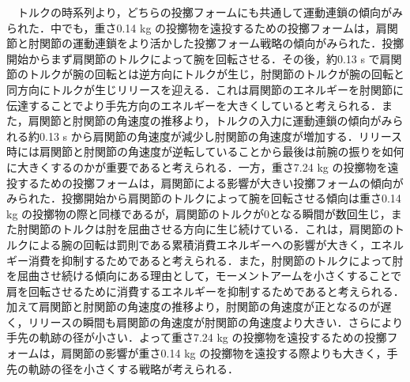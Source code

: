 　トルクの時系列より，どちらの投擲フォームにも共通して運動連鎖の傾向がみられた．中でも，重さ0.14 kg の投擲物を遠投するための投擲フォームは，肩関節と肘関節の運動連鎖をより活かした投擲フォーム戦略の傾向がみられた．投擲開始からまず肩関節のトルクによって腕を回転させる．その後，約0.13 s で肩関節のトルクが腕の回転とは逆方向にトルクが生じ，肘関節のトルクが腕の回転と同方向にトルクが生じリリースを迎える．これは肩関節のエネルギーを肘関節に伝達することでより手先方向のエネルギーを大きくしていると考えられる．また，肩関節と肘関節の角速度の推移より，トルクの入力に運動連鎖の傾向がみられる約0.13 s から肩関節の角速度が減少し肘関節の角速度が増加する．リリース時には肩関節と肘関節の角速度が逆転していることから最後は前腕の振りを如何に大きくするのかが重要であると考えられる．一方，重さ7.24 kg の投擲物を遠投するための投擲フォームは，肩関節による影響が大きい投擲フォームの傾向がみられた．投擲開始から肩関節のトルクによって腕を回転させる傾向は重さ0.14 kg の投擲物の際と同様であるが，肩関節のトルクが0となる瞬間が数回生じ，また肘関節のトルクは肘を屈曲させる方向に生じ続けている．これは，肩関節のトルクによる腕の回転は罰則である累積消費エネルギーへの影響が大きく，エネルギー消費を抑制するためであると考えられる．また，肘関節のトルクによって肘を屈曲させ続ける傾向にある理由として，モーメントアームを小さくすることで肩を回転させるために消費するエネルギーを抑制するためであると考えられる．加えて肩関節と肘関節の角速度の推移より，肘関節の角速度が正となるのが遅く，リリースの瞬間も肩関節の角速度が肘関節の角速度より大きい．さらにより手先の軌跡の径が小さい．よって重さ7.24 kg の投擲物を遠投するための投擲フォームは，肩関節の影響が重さ0.14 kg の投擲物を遠投する際よりも大きく，手先の軌跡の径を小さくする戦略が考えられる．\\

\clearpage
{}

